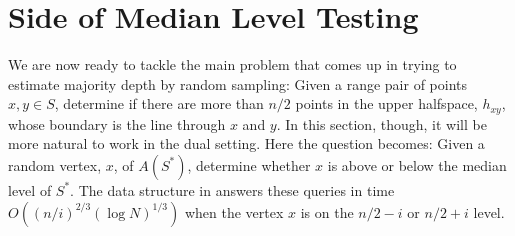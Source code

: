 \documentclass{patmorin}
\newcommand{\eps}{\varepsilon}
\begin{document}
%
%

\section{Side of Median Level Testing}

We are now ready to tackle the main problem that comes up in trying
to estimate majority depth by random sampling:  Given a range pair of
points $x,y\in S$, determine if there are more than $n/2$ points in
the upper halfspace, $h_{xy}$, whose boundary is the line through $x$
and $y$.  In this section, though, it will be more natural to work in
the dual setting.  Here the question becomes: Given a random vertex,
$x$, of $A(S^*)$, determine whether $x$ is above or below the median
level of $S^*$.  The data structure in  answers these
queries in time $O((n/i)^{2/3}(\log N)^{1/3})$ when the vertex $x$ is on the
$n/2-i$ or $n/2+i$ level.
\end{document}
